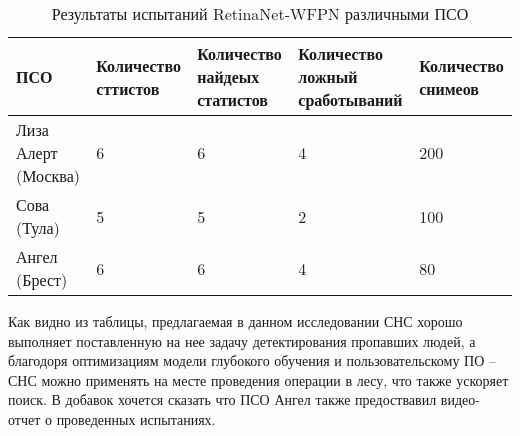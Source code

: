\begin{table}[H]
    \caption{Результаты испытаний RetinaNet-WFPN различными ПСО}\label{leaderboard-full}
    \begin{tabular}{|p{2.8cm}|p{3cm}|p{3cm}|p{3cm}|p{3cm}|}
        \hline
        {ПСО} & {Количество сттистов} & {Количество найдеых статистов} & {Количество ложный сработываний} & {Количество снимеов} \\
        \hline
        Лиза Алерт (Москва) & 6 & 6 & 4 & 200 \\
        \hline
        Сова (Тула) & 5 & 5 & 2 & 100 \\
        \hline
        Ангел (Брест) & 6 & 6 & 4 & 80 \\
        \hline
    \end{tabular}
\end{table}

Как видно из таблицы, предлагаемая в данном исследовании СНС хорошо выполняет поставленную на нее задачу детектирования пропавших людей, а благодоря оптимизациям модели глубокого обучения и пользовательскому ПО -- СНС можно применять на месте проведения операции в лесу, что также ускоряет поиск. В добавок хочется сказать что ПСО Ангел также предоствавил видео-отчет о проведенных испытаниях.

\clearpage
